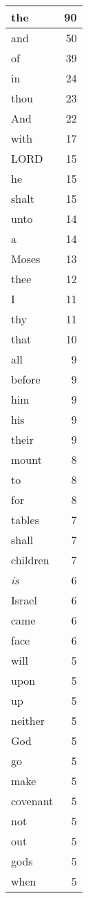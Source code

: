 \begin{center}
\begin{longtable}{l|r}
\hline \hline
\endlastfoot
the & 90 \\ \hline
and & 50 \\ \hline
of & 39 \\ \hline
in & 24 \\ \hline
thou & 23 \\ \hline
And & 22 \\ \hline
with & 17 \\ \hline
LORD & 15 \\ \hline
he & 15 \\ \hline
shalt & 15 \\ \hline
unto & 14 \\ \hline
a & 14 \\ \hline
Moses & 13 \\ \hline
thee & 12 \\ \hline
I & 11 \\ \hline
thy & 11 \\ \hline
that & 10 \\ \hline
all & 9 \\ \hline
before & 9 \\ \hline
him & 9 \\ \hline
his & 9 \\ \hline
their & 9 \\ \hline
mount & 8 \\ \hline
to & 8 \\ \hline
for & 8 \\ \hline
tables & 7 \\ \hline
shall & 7 \\ \hline
children & 7 \\ \hline
\emph{is} & 6 \\ \hline
Israel & 6 \\ \hline
came & 6 \\ \hline
face & 6 \\ \hline
will & 5 \\ \hline
upon & 5 \\ \hline
up & 5 \\ \hline
neither & 5 \\ \hline
God & 5 \\ \hline
go & 5 \\ \hline
make & 5 \\ \hline
covenant & 5 \\ \hline
not & 5 \\ \hline
out & 5 \\ \hline
gods & 5 \\ \hline
when & 5 \\ \hline

\end{longtable}
\end{center}
